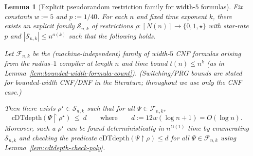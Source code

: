 \documentclass[12pt]{article}
\newtheorem{lemma}[theorem]{Lemma}
\theoremstyle{definition}
\theoremstyle{definition}
\theoremstyle{remark}
\theoremstyle{remark}
\begin{document}
\begin{lemma}[Explicit pseudorandom restriction family for width-$5$ formulas]
\label{lem:explicit-prg-width5}
Fix constants $w:=5$ and $p:=1/40$.  For each $n$ and fixed time exponent $k$, there exists
an explicit family $\mathcal{S}_{n,k}$ of restrictions $\rho:[N(n)]\to\{0,1,\star\}$ with
star-rate $p$ and $|\mathcal{S}_{n,k}|\le n^{a(k)}$ such that the following holds.

Let $\mathcal{F}_{n,k}$ be the (machine-independent) family of width-$5$ \emph{CNF} formulas
arising from the radius--$1$ compiler at length $n$ and time bound $t(n)\le n^k$
(as in Lemma~\ref{lem:bounded-width-formula-count}).
(Switching/PRG bounds are stated for bounded-width CNF/DNF in the literature; throughout we
use only the CNF case.)

Then there exists $\rho^\star\in \mathcal{S}_{n,k}$ such that for all $\Psi\in\mathcal{F}_{n,k}$,
\[
\mathrm{cDTdepth}(\Psi\!\upharpoonright\!\rho^\star)\ \le\ d
\qquad\text{where}\qquad
d:=12w(\log n+1)=O(\log n).
\]
Moreover, such a $\rho^\star$ can be found deterministically in $n^{O(1)}$ time by
enumerating $\mathcal{S}_{n,k}$ and checking the predicate
$\mathrm{cDTdepth}(\Psi\!\upharpoonright\!\rho)\le d$ for all $\Psi\in\mathcal{F}_{n,k}$
using Lemma~\ref{lem:cdtdepth-check-poly}.
\end{lemma}
\end{document}
